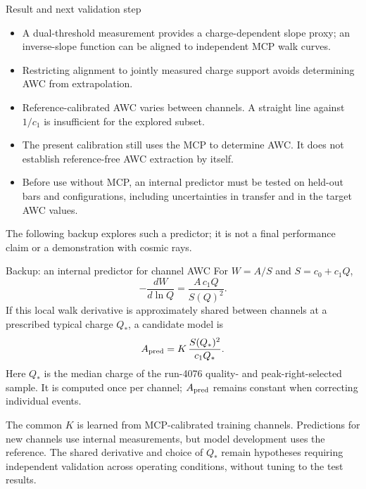 \begin{frame}{Result and next validation step}
\small
\begin{itemize}
\item A dual-threshold measurement provides a charge-dependent slope proxy;
an inverse-slope function can be aligned to independent MCP walk curves.
\item Restricting alignment to jointly measured charge support avoids
determining AWC from extrapolation.
\item Reference-calibrated AWC varies between channels. A straight line
against $1/c_1$ is insufficient for the explored subset.
\item The present calibration still uses the MCP to determine AWC.
It does not establish reference-free AWC extraction by itself.
\item Before use without MCP, an internal predictor must be tested on held-out
bars and configurations, including uncertainties in transfer and in the target AWC values.
\end{itemize}
\medskip
The following backup explores such a predictor; it is not a final
performance claim or a demonstration with cosmic rays.
\end{frame}

\begin{frame}{Backup: an internal predictor for channel AWC}
\small
For $W=A/S$ and $S=c_0+c_1Q$,
\[
 -\frac{dW}{d\ln Q}=\frac{A\,c_1Q}{S(Q)^2}.
\]
If this local walk derivative is approximately shared between channels at
a prescribed typical charge $Q_*$, a candidate model is
\[
 A_{\rm pred}=K\,\frac{S(Q_*)^2}{c_1Q_*}.
\]
Here $Q_*$ is the median charge of the run-4076 quality- and peak-right-selected
sample. It is computed once per channel; $A_{\rm pred}$ remains constant
when correcting individual events.

The common $K$ is learned from MCP-calibrated training channels. Predictions
for new channels use internal measurements, but model development uses the reference.
The shared derivative and choice of $Q_*$ remain hypotheses requiring
independent validation across operating conditions, without tuning to the test results.
\end{frame}





